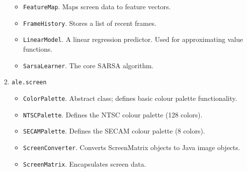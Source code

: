 \documentclass[12pt]{article}
\begin{document}
\begin{enumerate}
    \begin{itemize}
      \item{\verb+FeatureMap+. Maps screen data to feature vectors.}
      \item{\verb+FrameHistory+. Stores a list of recent frames.}
      \item{\verb+LinearModel+. A linear regression predictor. Used for approximating value functions.}
      \item{\verb+SarsaLearner+. The core SARSA algorithm.}
    \end{itemize}
  \item{\verb+ale.screen+}
    \begin{itemize}
      \item{\verb+ColorPalette+. Abstract class; defines basic colour palette functionality.}
      \item{\verb+NTSCPalette+. Defines the NTSC colour palette (128 colors).}
      \item{\verb+SECAMPalette+. Defines the SECAM colour palette (8 colors).}
      \item{\verb+ScreenConverter+. Converts ScreenMatrix objects to Java image objects.}
      \item{\verb+ScreenMatrix+. Encapsulates screen data.}
    \end{itemize}
\end{enumerate}
\end{document}
